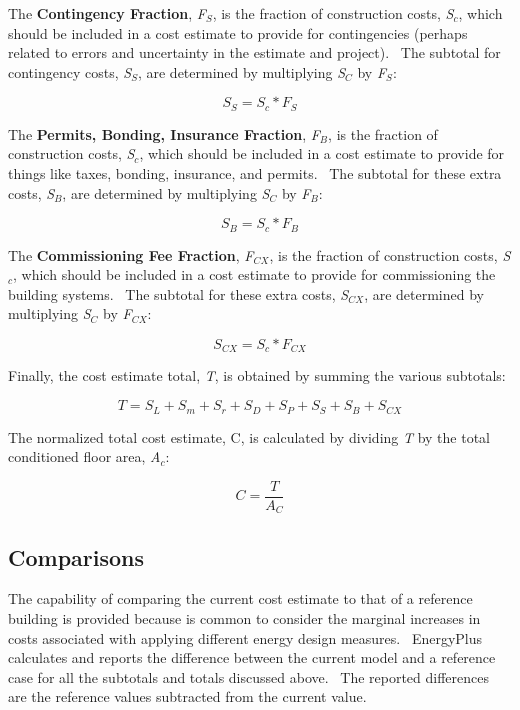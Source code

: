 The \textbf{Contingency Fraction}, \emph{F\(_{S}\)}, is the fraction of construction costs, \emph{S\(_{c}\)}, which should be included in a cost estimate to provide for contingencies (perhaps related to errors and uncertainty in the estimate and project).~ The subtotal for contingency costs, \emph{S\(_{S}\)}, are determined by multiplying \emph{S\(_{C}\)} by \emph{F\(_{S}\)}:

\begin{equation}
{S_S} = {S_c}*{F_S}
\end{equation}

The \textbf{Permits, Bonding, Insurance Fraction}, \emph{F\(_{B}\)}, is the fraction of construction costs, \emph{S\(_{c}\)}, which should be included in a cost estimate to provide for things like taxes, bonding, insurance, and permits.~ The subtotal for these extra costs, \emph{S\(_{B}\)}, are determined by multiplying \emph{S\(_{C}\)} by \emph{F\(_{B}\)}:

\begin{equation}
{S_B} = {S_c}*{F_B}
\end{equation}

The \textbf{Commissioning Fee Fraction}, \emph{F\(_{CX}\)}, is the fraction of construction costs, \emph{S\(_{c}\)}, which should be included in a cost estimate to provide for commissioning the building systems.~ The subtotal for these extra costs, \emph{S\(_{CX}\)}, are determined by multiplying \emph{S\(_{C}\)} by \emph{F\(_{CX}\)}:

\begin{equation}
{S_{CX}} = {S_c}*{F_{CX}}
\end{equation}

Finally, the cost estimate total, \emph{T}, is obtained by summing the various subtotals:

\begin{equation}
T = {S_L} + {S_m} + {S_r} + {S_D} + {S_P} + {S_S} + {S_B} + {S_{CX}}
\end{equation}

The normalized total cost estimate, C, is calculated by dividing \emph{T} by the total conditioned floor area, \emph{A\(_{c}\)}:

\begin{equation}
C = \frac{T}{{{A_C}}}
\end{equation}

\subsection{Comparisons}\label{comparisons}

The capability of comparing the current cost estimate to that of a reference building is provided because is common to consider the marginal increases in costs associated with applying different energy design measures.~ EnergyPlus calculates and reports the difference between the current model and a reference case for all the subtotals and totals discussed above.~ The reported differences are the reference values subtracted from the current value.
